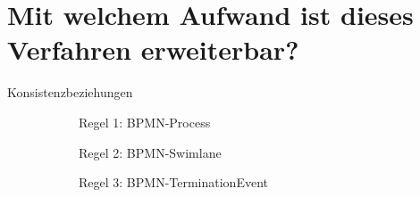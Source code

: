 \section{Mit welchem Aufwand ist dieses Verfahren erweiterbar?}


\begin{frame}{Konsistenzbeziehungen}
  \begin{figure}
    \centering
    \begin{subfigure}{0.3\textwidth}
      \centering
      \begin{adjustbox}{width=0.8\linewidth,center}
      \end{adjustbox}
      \caption*{\tiny{\textcolor{black!20}{Regel 1: BPMN-Process}}}%
    \end{subfigure}
    \hfill
    \begin{subfigure}{0.3\textwidth}
      \centering
      \begin{adjustbox}{width=0.8\linewidth,center}
      \end{adjustbox}
      \caption*{\tiny{\textcolor{black!20}{Regel 2: BPMN-Swimlane}}}%
    \end{subfigure}
    \hfill
    \begin{subfigure}{0.3\textwidth}
      \centering
      \begin{adjustbox}{width=0.8\linewidth,center}
      \end{adjustbox}
      \caption*{\tiny{\textcolor{black!20}{Regel 3: BPMN-TerminationEvent}}}%
    \end{subfigure}
    \begin{subfigure}{0.3\textwidth}
      \vspace{4pt}

\end{subfigure}
\end{figure}
\end{frame}

